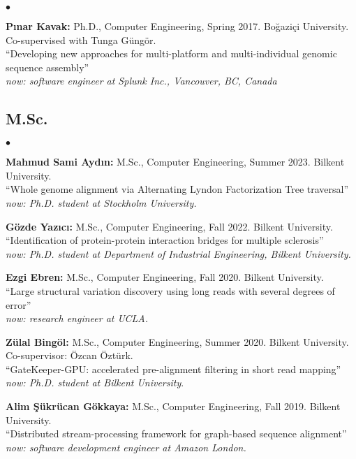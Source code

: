 \documentclass[margin,line]{res}
\newenvironment{list2}{
  \begin{list}{$\bullet$}{%
      \setlength{\itemsep}{0.1cm}
      \setlength{\parsep}{0in} \setlength{\parskip}{0in}
      \setlength{\topsep}{0in} \setlength{\partopsep}{0in} 
      \setlength{\leftmargin}{0.2in}}}{\end{list}}
\begin{document}
\begin{resume}
\begin{list2}
\item
  {\bf P{\i}nar Kavak:} Ph.D., Computer Engineering, Spring 2017.
  Bo\u{g}azi\c{c}i University. Co-supervised with Tunga G\"{u}ng\"{o}r.\\
  ``Developing new approaches for multi-platform and multi-individual genomic sequence assembly''\\
  {\it now: software engineer at Splunk Inc., Vancouver, BC, Canada}
\end{list2}

\vspace*{-.4cm}
\subsection{\small \sc M.Sc.}
\begin{list2}
\item
  {\bf Mahmud Sami Aydın:} M.Sc., Computer Engineering, Summer 2023.
  Bilkent University. \\
  ``Whole genome alignment via Alternating Lyndon Factorization Tree traversal''\\
   {\it now: Ph.D. student at Stockholm University.}
  \item
  {\bf Gözde Yazıcı:} M.Sc., Computer Engineering, Fall 2022.
  Bilkent University. \\
  ``Identification of protein-protein interaction bridges for multiple sclerosis''\\
   {\it now: Ph.D. student at Department of Industrial Engineering, Bilkent University.}
\item
  {\bf Ezgi Ebren:} M.Sc., Computer Engineering, Fall 2020. Bilkent University. \\
  ``Large structural variation discovery using long reads with several degrees of error''\\
  {\it now: research engineer at UCLA.}
\item
  {\bf Zülal Bingöl:} M.Sc., Computer Engineering, Summer 2020. Bilkent University. Co-supervisor: Özcan Öztürk.\\
  ``GateKeeper-GPU: accelerated pre-alignment filtering in short read mapping''\\
  {\it now: Ph.D. student at Bilkent University}.
\item
  {\bf Alim Şükrücan Gökkaya:} M.Sc., Computer Engineering, Fall 2019.
  Bilkent University. \\
  ``Distributed stream-processing framework for graph-based sequence alignment''\\
  {\it now: software development engineer at Amazon London.}

\end{list2}
\end{resume}
\end{document}
